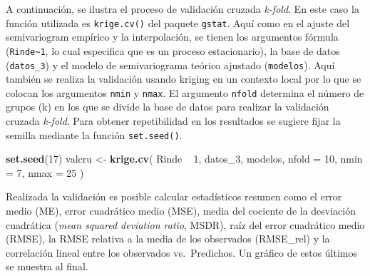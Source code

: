 \documentclass[11pt,b5paper,]{krantz}
\newenvironment{Shaded}{}{}
\newcommand{\DataTypeTok}[1]{\textcolor[rgb]{0.56,0.13,0.00}{#1}}
\newcommand{\DecValTok}[1]{\textcolor[rgb]{0.25,0.63,0.44}{#1}}
\newcommand{\KeywordTok}[1]{\textcolor[rgb]{0.00,0.44,0.13}{\textbf{#1}}}
\newcommand{\NormalTok}[1]{#1}
\newcommand{\OperatorTok}[1]{\textcolor[rgb]{0.40,0.40,0.40}{#1}}
\newcommand{\StringTok}[1]{\textcolor[rgb]{0.25,0.44,0.63}{#1}}
\begin{document}
A continuación, se ilustra el proceso de validación cruzada \emph{k-fold}. En este caso la función utilizada es \texttt{krige.cv()} del paquete \texttt{gstat}. Aquí como en el ajuste del semivariogram empírico y la interpolación, se tienen los argumentos fórmula (\texttt{Rinde\textasciitilde{}1}, lo cual especifica que es un proceso estacionario), la base de datos (\texttt{datos\_3}) y el modelo de semivariograma teórico ajustado (\texttt{modelos}). Aquí también se realiza la validación usando kriging en un contexto local por lo que se colocan los argumentos \texttt{nmin} y \texttt{nmax}. El argumento \texttt{nfold} determina el número de grupos (k) en los que se divide la base de datos para realizar la validación cruzada \emph{k-fold}. Para obtener repetibilidad en los resultados se sugiere fijar la semilla mediante la función \texttt{set.seed()}.

\begin{Shaded}
\begin{Highlighting}[]
\KeywordTok{set.seed}\NormalTok{(}\DecValTok{17}\NormalTok{)}
\NormalTok{valcru <-}
\StringTok{  }\KeywordTok{krige.cv}\NormalTok{(}
\NormalTok{    Rinde }\OperatorTok{~}\StringTok{ }\DecValTok{1}\NormalTok{,}
\NormalTok{    datos_}\DecValTok{3}\NormalTok{,}
\NormalTok{    modelos,}
    \DataTypeTok{nfold =} \DecValTok{10}\NormalTok{,}
    \DataTypeTok{nmin =} \DecValTok{7}\NormalTok{,}
    \DataTypeTok{nmax =} \DecValTok{25}
\NormalTok{  )}
\end{Highlighting}
\end{Shaded}

Realizada la validación es posible calcular estadísticos resumen como el error medio (ME), error cuadrático medio (MSE), media del cociente de la desviación cuadrática (\emph{mean squared deviation ratio}, MSDR), raíz del error cuadrático medio (RMSE), la RMSE relativa a la media de los observados (RMSE\_rel) y la correlación lineal entre los observados vs.~Predichos. Un gráfico de estos últimos se muestra al final.
\end{document}
